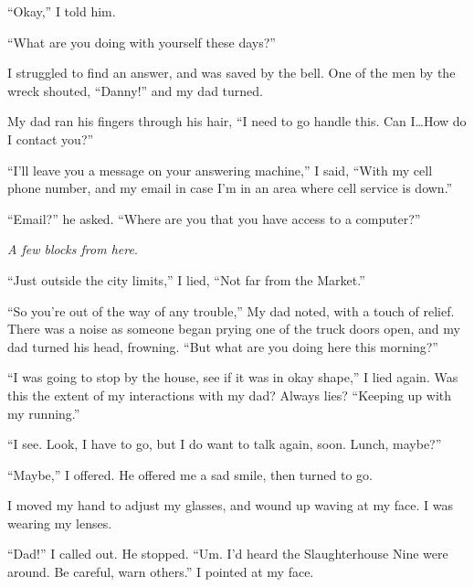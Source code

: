 ``Okay,'' I told him.



``What are you doing with yourself these days?''



I struggled to find an answer, and was saved by the bell.  One of the men by the wreck shouted, ``Danny!'' and my dad turned.



My dad ran his fingers through his hair, ``I need to go handle this.  Can I\ldots How do I contact you?''



``I'll leave you a message on your answering machine,'' I said, ``With my cell phone number, and my email in case I'm in an area where cell service is down.''



``Email?'' he asked.  ``Where are you that you have access to a computer?''



\emph{A few blocks from here}.



``Just outside the city limits,'' I lied, ``Not far from the Market.''



``So you're out of the way of any trouble,'' My dad noted, with a touch of relief.  There was a noise as someone began prying one of the truck doors open, and my dad turned his head, frowning.  ``But what are you doing here this morning?''



``I was going to stop by the house, see if it was in okay shape,'' I lied again.  Was this the extent of my interactions with my dad?  Always lies?  ``Keeping up with my running.''



``I see.  Look, I have to go, but I do want to talk again, soon.  Lunch, maybe?''



``Maybe,'' I offered.  He offered me a sad smile, then turned to go.



I moved my hand to adjust my glasses, and wound up waving at my face.  I was wearing my lenses.



``Dad!'' I called out.  He stopped.  ``Um.  I'd heard the Slaughterhouse Nine were around.  Be careful, warn others.''  I pointed at my face.




